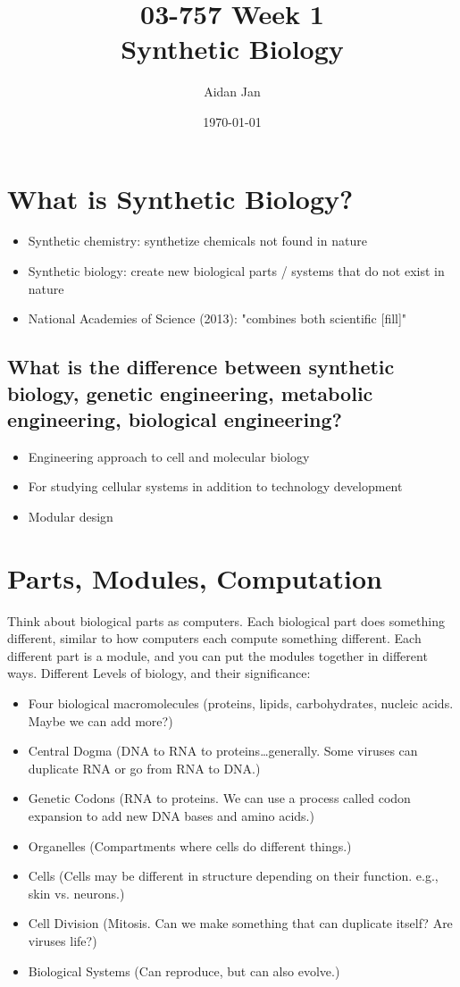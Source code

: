\documentclass[10pt]{article}
\title{03-757 Week 1 \\ \large{Synthetic Biology}}
\author{Aidan Jan}
\date{\today}
\begin{document}
\maketitle
\section*{What is Synthetic Biology?}
\begin{itemize}
	\item Synthetic chemistry: synthetize chemicals not found in nature
	\item Synthetic biology: create new biological parts / systems that do not exist in nature
	\item National Academies of Science (2013): "combines both scientific [fill]"
\end{itemize}

\subsection*{What is the difference between synthetic biology, genetic engineering, metabolic engineering, biological engineering?}
\begin{itemize}
	\item Engineering approach to cell and molecular biology
	\item For studying cellular systems in addition to technology development
	\item Modular design
\end{itemize}

\section*{Parts, Modules, Computation}
Think about biological parts as computers.  Each biological part does something different, similar to how computers each compute something different.  Each different part is a module, and you can put the modules together in different ways.
Different Levels of biology, and their significance:
\begin{itemize}
	\item Four biological macromolecules (proteins, lipids, carbohydrates, nucleic acids.  Maybe we can add more?)
	\item Central Dogma (DNA to RNA to proteins\dots generally.  Some viruses can duplicate RNA or go from RNA to DNA.)
	\item Genetic Codons (RNA to proteins.  We can use a process called codon expansion to add new DNA bases and amino acids.)
	\item Organelles (Compartments where cells do different things.)
	\item Cells (Cells may be different in structure depending on their function.  e.g., skin vs. neurons.)
	\item Cell Division (Mitosis.  Can we make something that can duplicate itself?  Are viruses life?)
	\item Biological Systems (Can reproduce, but can also evolve.)
\end{itemize}
\end{document}
